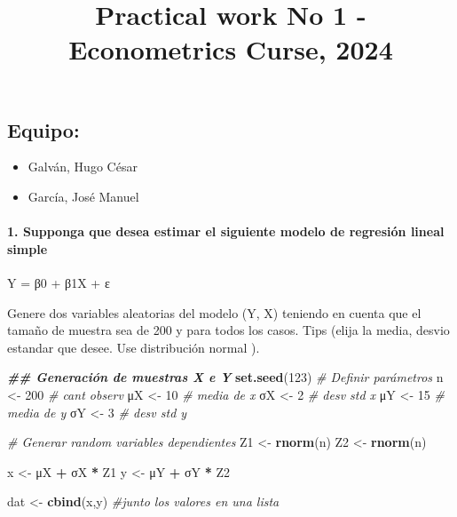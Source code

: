 \documentclass[
]{article}
\title{Practical work No 1 - Econometrics Curse, 2024}
\author{}
\date{\vspace{-2.5em}}
\newenvironment{Shaded}{\begin{snugshade}}{\end{snugshade}}
\newcommand{\CommentTok}[1]{\textcolor[rgb]{0.56,0.35,0.01}{\textit{#1}}}
\newcommand{\DecValTok}[1]{\textcolor[rgb]{0.00,0.00,0.81}{#1}}
\newcommand{\DocumentationTok}[1]{\textcolor[rgb]{0.56,0.35,0.01}{\textbf{\textit{#1}}}}
\newcommand{\FunctionTok}[1]{\textcolor[rgb]{0.13,0.29,0.53}{\textbf{#1}}}
\newcommand{\NormalTok}[1]{#1}
\newcommand{\OtherTok}[1]{\textcolor[rgb]{0.56,0.35,0.01}{#1}}
\newcommand{\SpecialCharTok}[1]{\textcolor[rgb]{0.81,0.36,0.00}{\textbf{#1}}}
\begin{document}
\maketitle

\hypertarget{equipo}{%
\subsection{Equipo:}\label{equipo}}

\begin{itemize}
\item
  Galván, Hugo César
\item
  García, José Manuel
\end{itemize}

\hypertarget{supponga-que-desea-estimar-el-siguiente-modelo-de-regresiuxf3n-lineal-simple}{%
\paragraph{1. Supponga que desea estimar el siguiente modelo de
regresión lineal
simple}\label{supponga-que-desea-estimar-el-siguiente-modelo-de-regresiuxf3n-lineal-simple}}

Y = β0 + β1X + ε

Genere dos variables aleatorias del modelo (Y, X) teniendo en cuenta que
el tamaño de muestra sea de 200 y para todos los casos. Tips (elija la
media, desvio estandar que desee. Use distribución normal ).

\begin{Shaded}
\begin{Highlighting}[]
\DocumentationTok{\#\# Generación de muestras X e Y}
\FunctionTok{set.seed}\NormalTok{(}\DecValTok{123}\NormalTok{) }
\CommentTok{\# Definir parámetros}
\NormalTok{n }\OtherTok{\textless{}{-}} \DecValTok{200} \CommentTok{\# cant observ}
\NormalTok{μX }\OtherTok{\textless{}{-}} \DecValTok{10} \CommentTok{\# media de x}
\NormalTok{σX }\OtherTok{\textless{}{-}} \DecValTok{2} \CommentTok{\# desv std x}
\NormalTok{μY }\OtherTok{\textless{}{-}} \DecValTok{15} \CommentTok{\# media de y}
\NormalTok{σY }\OtherTok{\textless{}{-}} \DecValTok{3} \CommentTok{\# desv std y}

\CommentTok{\# Generar random variables dependientes}
\NormalTok{Z1 }\OtherTok{\textless{}{-}} \FunctionTok{rnorm}\NormalTok{(n)}
\NormalTok{Z2 }\OtherTok{\textless{}{-}} \FunctionTok{rnorm}\NormalTok{(n)}

\NormalTok{x }\OtherTok{\textless{}{-}}\NormalTok{ μX }\SpecialCharTok{+}\NormalTok{ σX }\SpecialCharTok{*}\NormalTok{ Z1}
\NormalTok{y }\OtherTok{\textless{}{-}}\NormalTok{ μY }\SpecialCharTok{+}\NormalTok{ σY }\SpecialCharTok{*}\NormalTok{ Z2}

\NormalTok{dat }\OtherTok{\textless{}{-}} \FunctionTok{cbind}\NormalTok{(x,y) }\CommentTok{\#junto los valores en una lista}
\end{Highlighting}
\end{Shaded}
\end{document}
